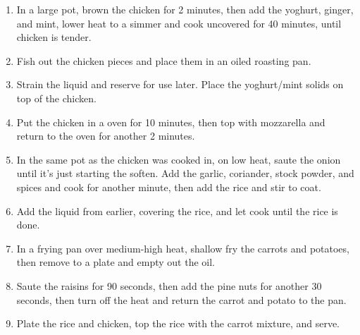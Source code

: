 \begin{enumerate}
    \item In a large pot, brown the chicken for 2 minutes, then add the yoghurt, ginger, and mint, lower heat to a simmer and cook uncovered for 40 minutes, until chicken is tender.
    \item Fish out the chicken pieces and place them in an oiled roasting pan.
    \item Strain the liquid and reserve for use later. Place the yoghurt/mint solids on top of the chicken.
    \item Put the chicken in a  oven for 10 minutes, then top with mozzarella and return to the oven for another 2 minutes.
    \item In the same pot as the chicken was cooked in, on low heat, saute the onion until it's just starting the soften. Add the garlic, coriander, stock powder, and spices and cook for another minute, then add the rice and stir to coat.
    \item Add the liquid from earlier, covering the rice, and let cook until the rice is done.
    \item In a frying pan over medium-high heat, shallow fry the carrots and potatoes, then remove to a plate and empty out the oil.
    \item Saute the raisins for 90 seconds, then add the pine nuts for another 30 seconds, then turn off the heat and return the carrot and potato to the pan.
    \item Plate the rice and chicken, top the rice with the carrot mixture, and serve.
\end{enumerate}